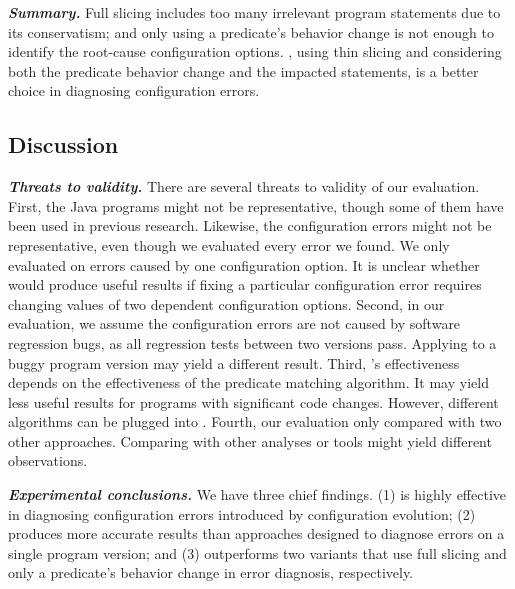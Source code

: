 \vspace{1mm}
\noindent \textbf{\textit{Summary.}} Full slicing
includes too many irrelevant program statements due to its
conservatism; and only using a predicate's behavior
change is not enough to identify the root-cause configuration options.
\ourtool, using thin slicing and considering both
the predicate behavior change and the impacted statements,
is a better choice in diagnosing configuration errors.

\subsection{Discussion}

\noindent \textbf{\textit{Threats to validity.}}
There are several threats to validity of our evaluation.
First, the \subjnum Java programs might not be representative, though some of them have been
used in previous research. Likewise, the
\errornum configuration errors might not be representative, even though we
evaluated every error we found. 
We only evaluated \ourtool on errors
caused by one configuration option.
It is unclear whether \ourtool would produce
useful results if fixing a particular configuration error
requires changing values of two dependent configuration options.
%
Second, in our evaluation, we assume the configuration errors
are not caused by software regression bugs, as all regression
tests between two versions pass. Applying \ourtool to a buggy
program version may yield a different result.
Third, \ourtool's effectiveness depends on the effectiveness of the
predicate matching algorithm. It may yield less
useful results for programs with significant code changes.
However, different algorithms can be plugged into \ourtool.
Fourth, our evaluation only compared \ourtool with two other
approaches. Comparing with other analyses or tools might yield
different observations.

\vspace{1mm}

\noindent \textbf{\textit{Experimental conclusions.}}
We have three chief findings. (1) \ourtool is highly effective
in diagnosing configuration errors introduced by configuration
evolution; (2) \ourtool produces more accurate results than
approaches designed to diagnose errors on a single program version;
and (3) \ourtool outperforms two variants
that use full slicing and only  a predicate's
behavior change in error diagnosis, respectively.

